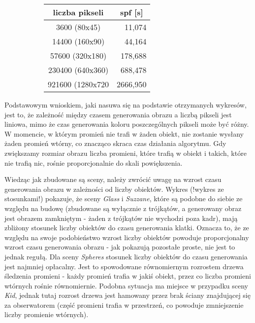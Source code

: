 \begin{figure}[!htb]
\advance\leftskip-2cm
\begin{subfigure}{.5\textwidth}
\end{subfigure}
\hspace{2cm}
\begin{subfigure}{.5\textwidth}
		\begin{longtable}{|c|r|} \hline
	    liczba pikseli & \multicolumn{1}{|c|}{spf [s]} \\ \hline
	    3600 (80x45) & 11,074 \\ 
	    14400 (160x90) & 44,164 \\
		57600 (320x180) & 178,688 \\
		230400 (640x360) & 688,478 \\
		921600 (1280x720 & 2666,950 \\
		\hline
		\end{longtable}
\end{subfigure}
\end{figure}

Podstawowym wnioskiem, jaki nasuwa się na podstawie otrzymanych wykresów, jest to, że zależność między czasem generowania obrazu a liczbą pikseli jest liniowa, mimo że czas generowania koloru poszczególnych pikseli może być różny. W momencie, w którym promień nie trafi w żaden obiekt, nie zostanie wysłany żaden promień wtórny, co znacząco skraca czas działania algorytmu. Gdy zwiększamy rozmiar obrazu liczba promieni, które trafią w obiekt i takich, które nie trafią nic, rośnie proporcjonalnie do skali powiększenia.

Wiedząc jak zbudowane są sceny, należy zwrócić uwagę na wzrost czasu generowania obrazu w zależności od liczby obiektów. Wykres (!wykres ze stosunkami!) pokazuje, że sceny \emph{Glass} i \emph{Suzzane}, które są podobne do siebie ze względu na budowę (zbudowane są wyłącznie z trójkątów, a generowany obraz jest obrazem zamkniętym - żaden z trójkątów nie wychodzi poza kadr), mają zbliżony stosunek liczby obiektów do czasu generowania klatki. Oznacza to, że ze względu na swoje podobieństwo wzrost liczby obiektów powoduje proporcjonalny wzrost czasu generowania obrazu - jak pokazują pozostałe proste, nie jest to jednak regułą. Dla sceny \emph{Spheres} stosunek liczby obiektów do czasu generowania jest najmniej opłacalny. Jest to spowodowane równomiernym rozrostem drzewa śledzenia promieni - każdy promień trafia w jakiś obiekt, przez co liczba promieni wtórnych rośnie równomiernie. Podobna sytuacja ma miejsce w przypadku sceny \emph{Kid}, jednak tutaj rozrost drzewa jest hamowany przez brak ściany znajdującej się za obserwatorem (część promieni trafia w przestrzeń, co powoduje zmniejszenie liczby promienie wtórnych).

